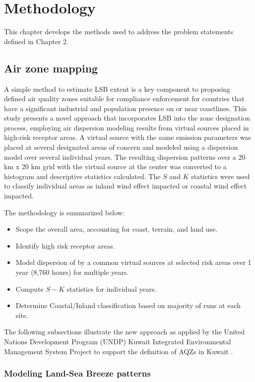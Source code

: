 \chapter{Methodology}
This chapter develops the methods used to address the problem statements defined in Chapter 2.

\section{Air zone mapping}

A simple method to estimate LSB extent is a key component to proposing defined air quality zones suitable for compliance enforcement for countries that have a significant industrial and population presence on or near coastlines.  This study presents a novel approach that incorporates LSB into the zone designation process, employing air dispersion modeling results from virtual sources placed in high-risk receptor areas.  A virtual source with the same emission parameters was placed at several designated areas of concern and modeled using a dispersion model over several individual years.  The resulting dispersion patterns over a 20 km x 20 km grid with the virtual source at the center was converted to a histogram and descriptive statistics calculated.  The $S$ and $K$ statistics were used to classify individual areas as inland wind effect impacted or coastal wind effect impacted.

The methodology is summarized below:
\begin{itemize}
\item Scope the overall area, accounting for coast, terrain, and land use.
\item Identify high risk receptor areas.
\item Model dispersion of by a common virtual sources at selected risk areas over 1 year (8,760 hours) for multiple years.
\item Compute $S-K$ statistics for individual years.
\item Determine Coastal/Inland classification based on majority of runs at each site.
\end{itemize}

The following subsections illustrate the new approach as applied by the United Nations Development Program (UNDP) Kuwait Integrated Environmental Management System Project to support the definition of AQZs in Kuwait \citep{Freeman2013}.  

\subsection{Modeling Land-Sea Breeze patterns}

